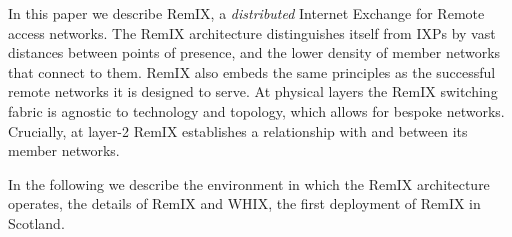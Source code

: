 In this paper we describe RemIX, a \emph{distributed} Internet Exchange for
Remote access networks. The RemIX architecture distinguishes itself from \acp{IXP}
 by vast distances between points of presence, and the lower density
of member networks that connect to them. RemIX also embeds the same
principles as the successful remote networks it is designed to serve.
At physical layers the RemIX switching fabric is agnostic to technology and
topology, which allows for bespoke networks. Crucially, at layer-2 RemIX
establishes a relationship with and between its member networks.

In the following we describe the environment in which the  RemIX architecture operates, the details of RemIX and   WHIX, the first deployment of RemIX  in Scotland.
